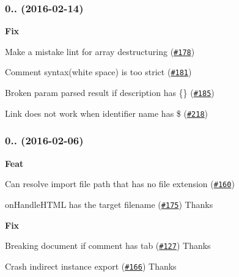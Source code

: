 \subsubsection*{0.. (2016-\/02-\/14)}


\begin{DoxyItemize}
\item {\bfseries Fix}
\begin{DoxyItemize}
\item Make a mistake lint for array destructuring (\href{https://github.com/esdoc/esdoc/issues/178}{\tt \#178})
\item Comment syntax(white space) is too strict (\href{https://github.com/esdoc/esdoc/issues/181}{\tt \#181})
\item Broken param parsed result if description has {\ttfamily \{\}} (\href{https://github.com/esdoc/esdoc/issues/185}{\tt \#185})
\item Link does not work when identifier name has {\ttfamily \$} (\href{https://github.com/esdoc/esdoc/issues/218}{\tt \#218})
\end{DoxyItemize}
\end{DoxyItemize}

\subsubsection*{0.. (2016-\/02-\/06)}


\begin{DoxyItemize}
\item {\bfseries Feat}
\begin{DoxyItemize}
\item Can resolve import file path that has no file extension (\href{https://github.com/esdoc/esdoc/issues/160}{\tt \#160})
\item {\ttfamily on\+Handle\+H\+T\+ML} has the target filename (\href{https://github.com/esdoc/esdoc/pull/175}{\tt \#175}) Thanks \href{https://github.com/skratchdot}{\tt }
\end{DoxyItemize}
\item {\bfseries Fix}
\begin{DoxyItemize}
\item Breaking document if comment has tab (\href{https://github.com/esdoc/esdoc/issues/127}{\tt \#127}) Thanks \href{https://github.com/developit}{\tt }
\item Crash indirect instance export (\href{https://github.com/esdoc/esdoc/issues/166}{\tt \#166}) Thanks \href{https://github.com/kogai}{\tt }
\end{DoxyItemize}
\end{DoxyItemize}

